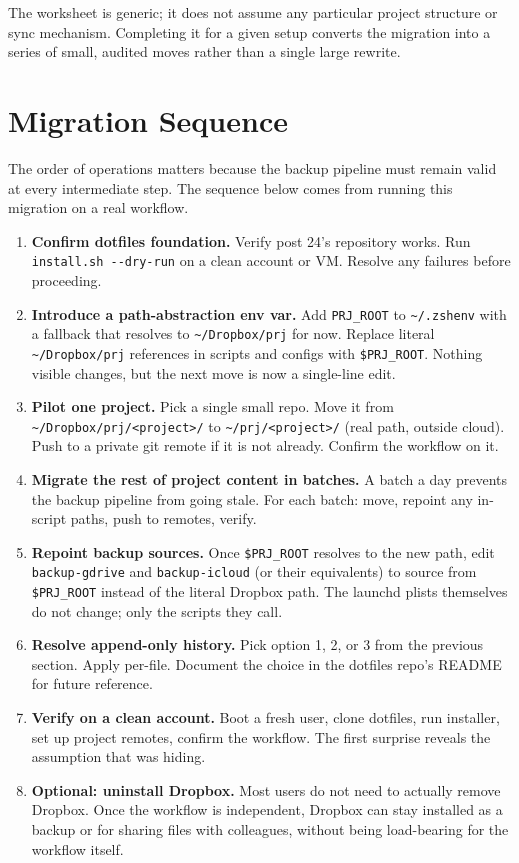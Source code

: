 \documentclass[
  11pt,
  letterpaper,
  DIV=11,
  numbers=noendperiod]{scrartcl}
\providecommand{\tightlist}{%
  \setlength{\itemsep}{0pt}\setlength{\parskip}{0pt}}\usepackage{longtable,booktabs,array}
\begin{document}
The worksheet is generic; it does not assume any particular project
structure or sync mechanism. Completing it for a given setup converts
the migration into a series of small, audited moves rather than a single
large rewrite.

\section{Migration Sequence}\label{migration-sequence}

The order of operations matters because the backup pipeline must remain
valid at every intermediate step. The sequence below comes from running
this migration on a real workflow.

\begin{enumerate}
\def\labelenumi{\arabic{enumi}.}
\tightlist
\item
  \textbf{Confirm dotfiles foundation.} Verify post 24's repository
  works. Run \texttt{install.sh\ -\/-dry-run} on a clean account or VM.
  Resolve any failures before proceeding.
\item
  \textbf{Introduce a path-abstraction env var.} Add \texttt{PRJ\_ROOT}
  to \texttt{\textasciitilde{}/.zshenv} with a fallback that resolves to
  \texttt{\textasciitilde{}/Dropbox/prj} for now. Replace literal
  \texttt{\textasciitilde{}/Dropbox/prj} references in scripts and
  configs with \texttt{\$PRJ\_ROOT}. Nothing visible changes, but the
  next move is now a single-line edit.
\item
  \textbf{Pilot one project.} Pick a single small repo. Move it from
  \texttt{\textasciitilde{}/Dropbox/prj/\textless{}project\textgreater{}/}
  to \texttt{\textasciitilde{}/prj/\textless{}project\textgreater{}/}
  (real path, outside cloud). Push to a private git remote if it is not
  already. Confirm the workflow on it.
\item
  \textbf{Migrate the rest of project content in batches.} A batch a day
  prevents the backup pipeline from going stale. For each batch: move,
  repoint any in-script paths, push to remotes, verify.
\item
  \textbf{Repoint backup sources.} Once \texttt{\$PRJ\_ROOT} resolves to
  the new path, edit \texttt{backup-gdrive} and \texttt{backup-icloud}
  (or their equivalents) to source from \texttt{\$PRJ\_ROOT} instead of
  the literal Dropbox path. The launchd plists themselves do not change;
  only the scripts they call.
\item
  \textbf{Resolve append-only history.} Pick option 1, 2, or 3 from the
  previous section. Apply per-file. Document the choice in the dotfiles
  repo's README for future reference.
\item
  \textbf{Verify on a clean account.} Boot a fresh user, clone dotfiles,
  run installer, set up project remotes, confirm the workflow. The first
  surprise reveals the assumption that was hiding.
\item
  \textbf{Optional: uninstall Dropbox.} Most users do not need to
  actually remove Dropbox. Once the workflow is independent, Dropbox can
  stay installed as a backup or for sharing files with colleagues,
  without being load-bearing for the workflow itself.
\end{enumerate}
\end{document}
